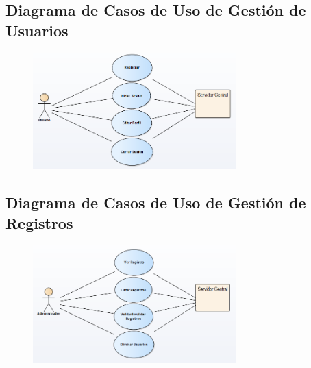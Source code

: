 		\subsection{Diagrama de Casos de Uso de Gestión de Usuarios}
			\begin{figure}[H]
			\centering
				\includegraphics[width=0.7\textwidth]{imagenes/analisis/casos-uso-usuario.png}
				\label{fig:casos-de-uso-usuario}
			\end{figure}

		\subsection{Diagrama de Casos de Uso de Gestión de Registros}
			\begin{figure}[H]
			\centering
				\includegraphics[width=0.7\textwidth]{imagenes/analisis/casos-uso-registros.png}
				\label{fig:casos-de-uso-tienda}
			\end{figure}

